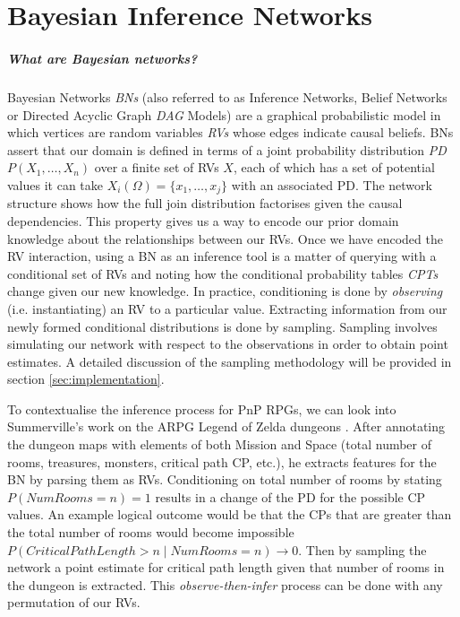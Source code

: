 \documentclass{UoYCSproject}
\begin{document}
\chapter{Bayesian Inference Networks}
\label{ch:BNETS}
\paragraph{What are Bayesian networks?}
Bayesian Networks \textit{BNs} \parencite{pearl1985bayesian} (also referred to as Inference Networks, Belief Networks or Directed Acyclic Graph \textit{DAG} Models) are a graphical probabilistic model in which vertices are random variables \textit{RVs} whose edges indicate causal beliefs. BNs assert that our domain is defined in terms of a joint probability distribution \textit{PD} \(P(X_1, \ldots , X_n)\) over a finite set of RVs \(X\), each of which has a set of potential values it can take \(X_i(\Omega) = \{x_1, \ldots, x_j\}\) with an associated PD. The network structure shows how the full join distribution factorises given the causal dependencies. This property gives us a way to encode our prior domain knowledge about the relationships between our RVs.
Once we have encoded the RV interaction, using a BN as an inference tool is a matter of querying with a conditional set of RVs and noting how the conditional probability tables \textit{CPTs} change given our new knowledge. In practice, conditioning is done by \textit{observing} (i.e. instantiating) an RV to a particular value. Extracting information from our newly formed conditional distributions is done by sampling. Sampling involves simulating our network with respect to the observations in order to obtain point estimates. A detailed discussion of the sampling methodology will be provided in section \ref{sec:implementation}.

To contextualise the inference process for PnP RPGs, we can look into Summerville's work on the ARPG Legend of Zelda dungeons \parencite{SummervilleLearningOfZelda}. After annotating the dungeon maps with elements of both Mission and Space (total number of rooms, treasures, monsters, critical path CP, etc.), he extracts features for the BN by parsing them as RVs. Conditioning on total number of rooms by stating \(P(NumRooms = n) = 1\) results in a change of the PD for the possible CP values. An example logical outcome would be that the CPs that are greater than the total number of rooms would become impossible \(P(CriticalPathLength > n \mid NumRooms = n) \rightarrow 0 \). Then by sampling the network a point estimate for critical path length given that number of rooms in the dungeon is extracted. This \textit{observe-then-infer} process can be done with any permutation of our RVs.
\end{document}
